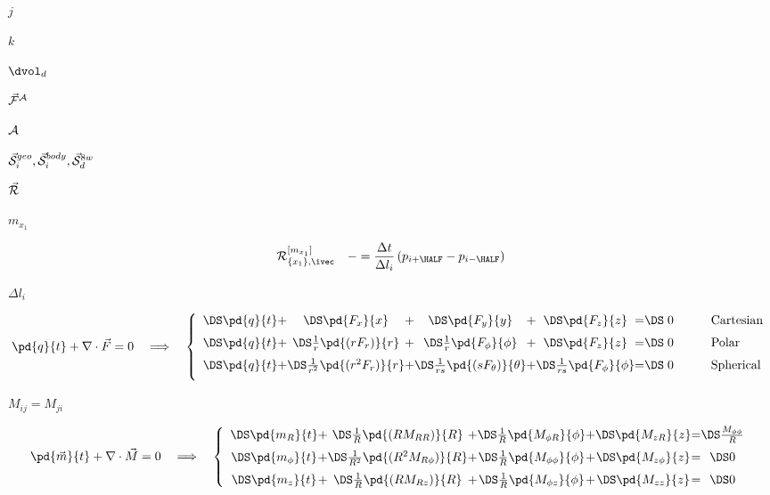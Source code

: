 \documentclass{article}
\begin{document}
$ j $
\pagebreak

$ k $
\pagebreak

$ \dvol_d $
\pagebreak

$ \vec{\cal F}^{\cal A} $
\pagebreak

$ {\cal A} $
\pagebreak

$ \vec{\cal S}^{geo}_i, \vec{\cal S}^{body}_i, 
 \vec{\cal S}^{8w}_d $
\pagebreak

$ \vec{\cal R} $
\pagebreak

$ m_{x_1} $
\pagebreak

\[
  {\cal R}_{\{x_1\},\ivec}^{[m_{x_1}]} \quad -= \frac{\Delta t}{\Delta l_i}
                     \left(p_{i+\HALF} - p_{i-\HALF}\right)
 \]
\pagebreak

$ \Delta l_i $
\pagebreak

\[
   \pd{q}{t} + \nabla\cdot\vec{F} = 0\quad\Longrightarrow\quad
   \left\{\begin{array}{c@{+}c@{+}c@{+}c@{=}cl}
   \DS \pd{q}{t}  & \DS
   \pd{F_x}{x}    & \DS
   \pd{F_y}{y}    & \DS
   \pd{F_z}{z}    & \DS\; 0 &\qquad\textrm{Cartesian}
   \\ \noalign{\medskip}
   \DS \pd{q}{t}                   & \DS
   \frac{1}{r}\pd{(rF_{r})}{r}     & \DS
   \frac{1}{r}\pd{F_{\phi}}{\phi}  & \DS
              \pd{F_z}{z}          &  \DS \;0 & \qquad\textrm{Polar}
   \\ \noalign{\medskip}
   \DS \pd{q}{t}                   & \DS
   \frac{1}{r^2}\pd{(r^2F_{r})}{r} & \DS
   \frac{1}{rs}\pd{(s F_{\theta})}{\theta}  & \DS
   \frac{1}{rs}\pd{F_\phi}{\phi}            & \DS\;  0 &\qquad\textrm{Spherical}
   \\ \noalign{\medskip}
   \end{array}\right.
 \]
\pagebreak

$ M_{ij} = M_{ji} $
\pagebreak

\[
     \pd{\vec{m}}{t} + \nabla\cdot\vec{M} = 0
       \quad \Longrightarrow \quad \left\{
     \begin{array}{c@{+}c@{+}c@{+}c@{=}c}
     \DS \pd{m_{R}}{t}                              & \DS
     \frac{1}{R}\pd{(RM_{RR})}{R}        & \DS
     \frac{1}{R}\pd{M_{\phi R}}{\phi} & \DS
            \pd{  M_{zR}}{z}        & \DS
     \frac{M_{\phi\phi}}{R}
     \\ \noalign{\medskip}
     \DS \pd{m_{\phi}}{t}                     & \DS
     \frac{1}{R^2}\pd{(R^2M_{R    \phi})}{R}    & \DS
     \frac{1}{R}  \pd{    M_{\phi \phi}}{\phi}  & \DS
                  \pd{    M_{z    \phi}}{z}     & \DS
           0
     \\ \noalign{\medskip}
     \DS \pd{m_z}{t}                   & \DS
     \frac{1}{R}\pd{(R  M_{Rz})}{R}   & \DS
     \frac{1}{R}\pd{M_{\phi z}}{\phi} & \DS
            \pd{M_{zz}}{z}        & \DS 0
     \end{array}\right.
   \]
\pagebreak
\end{document}
